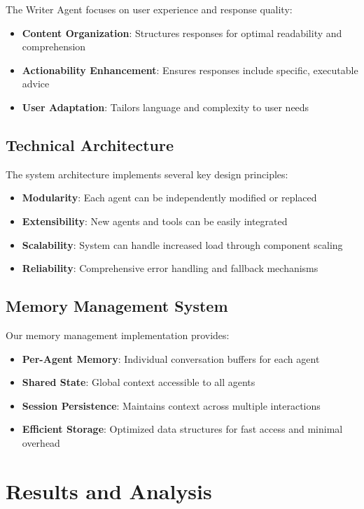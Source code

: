 \documentclass[conference]{IEEEtran}
\begin{document}
The Writer Agent focuses on user experience and response quality:

\begin{itemize}
\item \textbf{Content Organization}: Structures responses for optimal readability and comprehension
\item \textbf{Actionability Enhancement}: Ensures responses include specific, executable advice
\item \textbf{User Adaptation}: Tailors language and complexity to user needs
\end{itemize}

\subsection{Technical Architecture}

The system architecture implements several key design principles:

\begin{itemize}
\item \textbf{Modularity}: Each agent can be independently modified or replaced
\item \textbf{Extensibility}: New agents and tools can be easily integrated
\item \textbf{Scalability}: System can handle increased load through component scaling
\item \textbf{Reliability}: Comprehensive error handling and fallback mechanisms
\end{itemize}

\subsection{Memory Management System}

Our memory management implementation provides:

\begin{itemize}
\item \textbf{Per-Agent Memory}: Individual conversation buffers for each agent
\item \textbf{Shared State}: Global context accessible to all agents
\item \textbf{Session Persistence}: Maintains context across multiple interactions
\item \textbf{Efficient Storage}: Optimized data structures for fast access and minimal overhead
\end{itemize}

\section{Results and Analysis}
\end{document}
